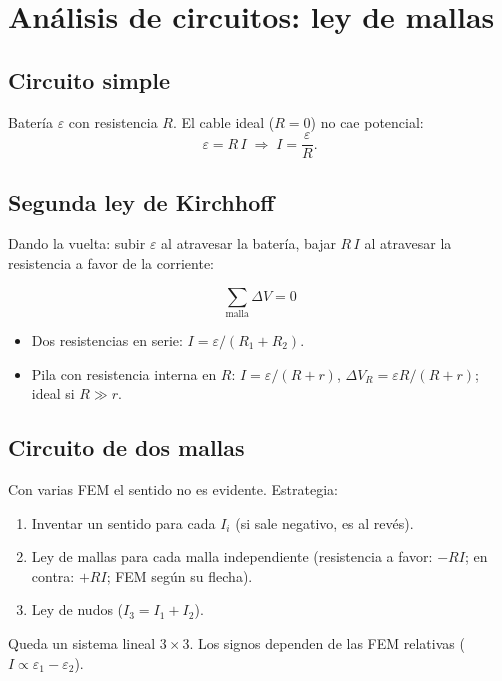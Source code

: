 \documentclass[12pt,a4paper]{article}
\begin{document}


\section{Análisis de circuitos: ley de mallas}

\subsection{Circuito simple}

Batería $\varepsilon$ con resistencia $R$. El cable ideal ($R=0$) no cae
potencial:
\[
\varepsilon = R\,I \;\Longrightarrow\; \boxed{I = \frac{\varepsilon}{R}}.
\]

\subsection{Segunda ley de Kirchhoff}

Dando la vuelta: subir $\varepsilon$ al atravesar la batería, bajar $R\,I$
al atravesar la resistencia a favor de la corriente:

\begin{keybox}
  \[
  \boxed{\sum_{\text{malla}} \Delta V = 0}
  \]
\end{keybox}

\begin{itemize}[nosep]
  \item Dos resistencias en serie: $I = \varepsilon/(R_1+R_2)$.
  \item Pila con resistencia interna en $R$: $I = \varepsilon/(R+r)$,
        $\Delta V_R = \varepsilon R/(R+r)$; ideal si $R \gg r$.
\end{itemize}



\subsection{Circuito de dos mallas}

Con varias FEM el sentido no es evidente. Estrategia:
\begin{enumerate}[nosep]
  \item Inventar un sentido para cada $I_i$ (si sale negativo, es al
        revés).
  \item Ley de mallas para cada malla independiente (resistencia a favor:
        $-RI$; en contra: $+RI$; FEM según su flecha).
  \item Ley de nudos ($I_3 = I_1 + I_2$).
\end{enumerate}
Queda un sistema lineal $3\times3$. Los signos dependen de las FEM
relativas ($I \propto \varepsilon_1 - \varepsilon_2$).
\end{document}
